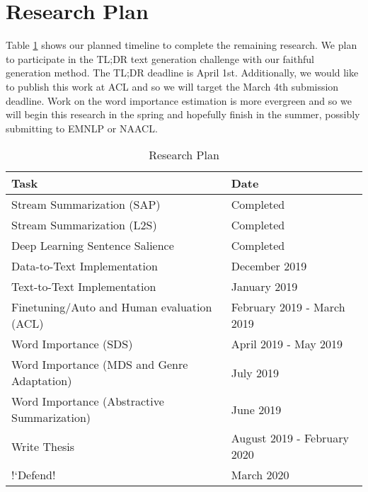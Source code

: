 \section{Research Plan}
\label{sec:research_plan}

Table \ref{tbl:researchplan} shows our planned timeline to complete 
the remaining research. We plan to participate in the TL;DR text generation 
challenge  \citep{syed2018task} with our faithful generation method. The TL;DR deadline is
April 1st. Additionally, we would like to publish this work at ACL and so
we will target the March 4th submission deadline.
Work on the word importance estimation is more evergreen and so we will begin
this research in the spring and hopefully finish in the summer, possibly 
submitting to EMNLP or NAACL.


\begin{table}[h]
    \centering
\begin{tabular}{|ll|}
    \toprule
    \textbf{Task} & \textbf{Date} \\
    \midrule
    Stream Summarization (SAP) & Completed \\
    \hline
    Stream Summarization (L2S) & Completed \\
    \hline
    Deep Learning Sentence Salience & Completed \\
    \hline
     Data-to-Text Implementation & December 2019\\
    \hline
    Text-to-Text Implementation & January 2019 \\
    \hline
    Finetuning/Auto and Human evaluation (ACL) & February 2019 - March 2019\\
    \hline
    Word Importance (SDS) &  April 2019 - May 2019 \\
    \hline
    Word Importance (MDS and Genre Adaptation) & July 2019 \\
    \hline
    Word Importance (Abstractive Summarization) & June 2019 \\
    \hline
    Write Thesis & August 2019 - February 2020 \\
    \hline
    !`Defend! & March 2020 \\
    \bottomrule
\end{tabular}
\caption{Research Plan}
\label{tbl:researchplan}
\end{table}
